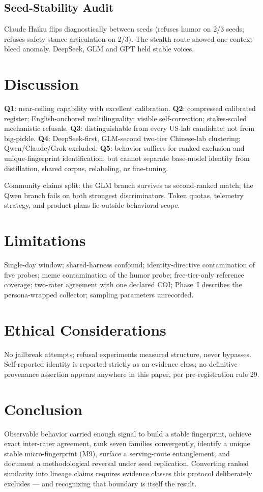 \documentclass[conference]{IEEEtran}
\begin{document}
\subsection{Seed-Stability Audit}
Claude Haiku flips diagnostically between seeds (refuses humor on 2/3 seeds; refuses safety-stance articulation on 2/3). The stealth route showed one context-bleed anomaly. DeepSeek, GLM and GPT held stable voices.

\section{Discussion}
\textbf{Q1}: near-ceiling capability with excellent calibration. \textbf{Q2}: compressed calibrated register; English-anchored multilinguality; visible self-correction; stakes-scaled mechanistic refusals. \textbf{Q3}: distinguishable from every US-lab candidate; not from big-pickle. \textbf{Q4}: DeepSeek-first, GLM-second two-tier Chinese-lab clustering; Qwen/Claude/Grok excluded. \textbf{Q5}: behavior suffices for ranked exclusion and unique-fingerprint identification, but cannot separate base-model identity from distillation, shared corpus, relabeling, or fine-tuning.

Community claims split: the GLM branch survives as second-ranked match; the Qwen branch fails on both strongest discriminators. Token quotas, telemetry strategy, and product plans lie outside behavioral scope.

\section{Limitations}
Single-day window; shared-harness confound; identity-directive contamination of five probes; meme contamination of the humor probe; free-tier-only reference coverage; two-rater agreement with one declared COI; Phase~I describes the persona-wrapped collector; sampling parameters unrecorded.

\section{Ethical Considerations}
No jailbreak attempts; refusal experiments measured structure, never bypasses. Self-reported identity is reported strictly as an evidence class; no definitive provenance assertion appears anywhere in this paper, per pre-registration rule 29.

\section{Conclusion}
Observable behavior carried enough signal to build a stable fingerprint, achieve exact inter-rater agreement, rank seven families convergently, identify a unique stable micro-fingerprint (M9), surface a serving-route entanglement, and document a methodological reversal under seed replication. Converting ranked similarity into lineage claims requires evidence classes this protocol deliberately excludes --- and recognizing that boundary is itself the result.
\end{document}
